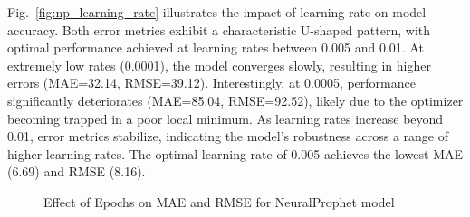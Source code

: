 \par Fig.~\ref{fig:np_learning_rate} illustrates the impact of learning rate on model accuracy. Both error metrics exhibit a characteristic U-shaped pattern, with optimal performance achieved at learning rates between 0.005 and 0.01. At extremely low rates (0.0001), the model converges slowly, resulting in higher errors (MAE=32.14, RMSE=39.12). Interestingly, at 0.0005, performance significantly deteriorates (MAE=85.04, RMSE=92.52), likely due to the optimizer becoming trapped in a poor local minimum. As learning rates increase beyond 0.01, error metrics stabilize, indicating the model's robustness across a range of higher learning rates. The optimal learning rate of 0.005 achieves the lowest MAE (6.69) and RMSE (8.16).

\begin{figure}[htbp]
    \centering
    \caption{Effect of Epochs on MAE and RMSE for NeuralProphet model}
    \label{fig:np_mae_rmse}
\end{figure}


